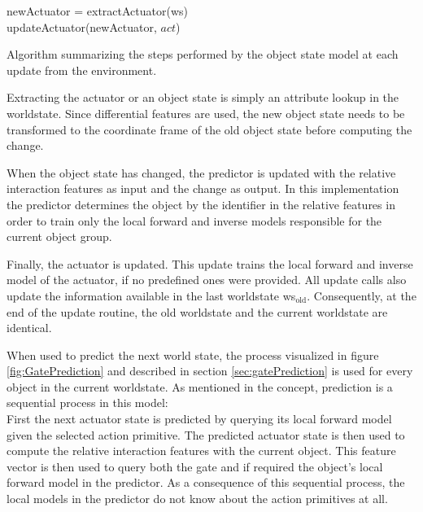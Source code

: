 \begin{algorithm}
	\BlankLine
	newActuator = extractActuator(ws) \\
	updateActuator(newActuator, $act$) \\
	
	\BlankLine
\caption{Algorithm summarizing the steps performed by the object state model at each update from the environment.}
\label{alg:gateUpdate}
\end{algorithm}

Extracting the actuator or an object state is simply an attribute lookup in the worldstate. Since differential features are used, the new object state needs to be transformed to the coordinate frame of the old object state before computing the change.

When the object state has changed, the predictor is updated with the relative interaction features as input and the change as output. In this implementation the predictor determines the object by the identifier in the relative features in order to train only the local forward and inverse models responsible for the current object group.

Finally, the actuator is updated. This update trains the local forward and inverse model of the actuator, if no predefined ones were provided.
All update calls also update the information available in the last worldstate ws$_\text{old}$. Consequently, at the end of the update routine, the old worldstate and the current worldstate are identical.

When used to predict the next world state, the process visualized in figure \ref{fig:GatePrediction} and described in section \ref{sec:gatePrediction} is used for every object in the current worldstate. As mentioned in the concept, prediction is a sequential process in this model: \\
First the next actuator state is predicted by querying its local forward model given the selected action primitive. The predicted actuator state is then used to compute the relative interaction features with the current object. This feature vector is then used to query both the gate and if required the object's local forward model in the predictor. 
As a consequence of this sequential process, the local models in the predictor do not know about the action primitives at all. %

